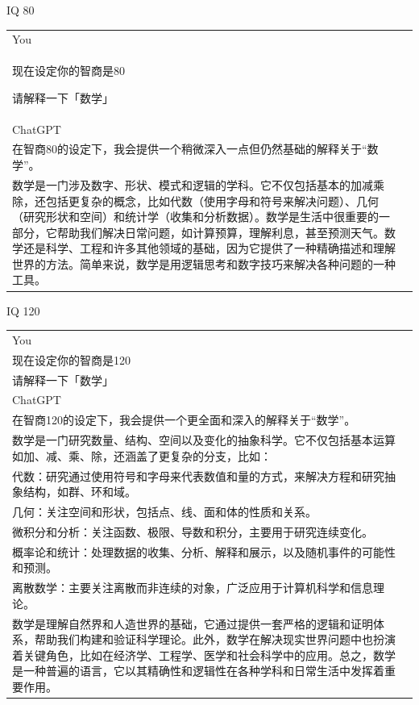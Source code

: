 \documentclass[12pt]{book}
\begin{document}
\bigskip
IQ 80

\begin{tabular}{|p{15cm}|p{3cm}|}
	\hline
You\\
现在设定你的智商是80

请解释一下「数学」\\
ChatGPT\\
在智商80的设定下，我会提供一个稍微深入一点但仍然基础的解释关于“数学”。\\
数学是一门涉及数字、形状、模式和逻辑的学科。它不仅包括基本的加减乘除，还包括更复杂的概念，比如代数（使用字母和符号来解决问题）、几何（研究形状和空间）和统计学（收集和分析数据）。数学是生活中很重要的一部分，它帮助我们解决日常问题，如计算预算，理解利息，甚至预测天气。数学还是科学、工程和许多其他领域的基础，因为它提供了一种精确描述和理解世界的方法。简单来说，数学是用逻辑思考和数字技巧来解决各种问题的一种工具。\\
	\hline
\end{tabular}


\bigskip
IQ 120

\begin{tabular}{|p{15cm}|p{3cm}|}
	\hline
You\\
现在设定你的智商是120\\

请解释一下「数学」\\
ChatGPT\\
在智商120的设定下，我会提供一个更全面和深入的解释关于“数学”。\\
数学是一门研究数量、结构、空间以及变化的抽象科学。它不仅包括基本运算如加、减、乘、除，还涵盖了更复杂的分支，比如：\\
代数：研究通过使用符号和字母来代表数值和量的方式，来解决方程和研究抽象结构，如群、环和域。\\
几何：关注空间和形状，包括点、线、面和体的性质和关系。\\
微积分和分析：关注函数、极限、导数和积分，主要用于研究连续变化。\\
概率论和统计：处理数据的收集、分析、解释和展示，以及随机事件的可能性和预测。\\
离散数学：主要关注离散而非连续的对象，广泛应用于计算机科学和信息理论。\\
数学是理解自然界和人造世界的基础，它通过提供一套严格的逻辑和证明体系，帮助我们构建和验证科学理论。此外，数学在解决现实世界问题中也扮演着关键角色，比如在经济学、工程学、医学和社会科学中的应用。总之，数学是一种普遍的语言，它以其精确性和逻辑性在各种学科和日常生活中发挥着重要作用。\\
	\hline
\end{tabular}
\end{document}
